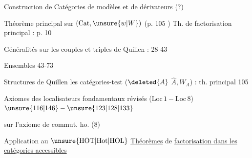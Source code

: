 Construction de Catégories de modèles et de dérivateurs (?)

Théorème principal sur $(\mathrm{Cat},\unsure{w|W})$ (p. $105$ )
Th. de factorisation principal : p. 10

Généralités sur les couples et triples de Quillen : 28-43

Ensembles  \hfill 43-73

Structures de Quillen  les catégories-test ($\deleted{A}$ $\widehat A,W_A$) : th. principal \hfill 105

Axiomes des localisateurs fondamentaux révisés ($\mathrm{Loc}\,1-\mathrm{Loc}\,8$) \hfill $\unsure{116|146}-\unsure{123|128|133}$ 

 sur l'axiome de commut. ho. (8)
\margin{$\vert$}

Application au  $\unsure{\mathrm{HOT}|\mathrm{Hot}|\mathrm{HOL}}$
\uline{Théorèmes} de \uline{factorisation dans les catégories accessibles}


